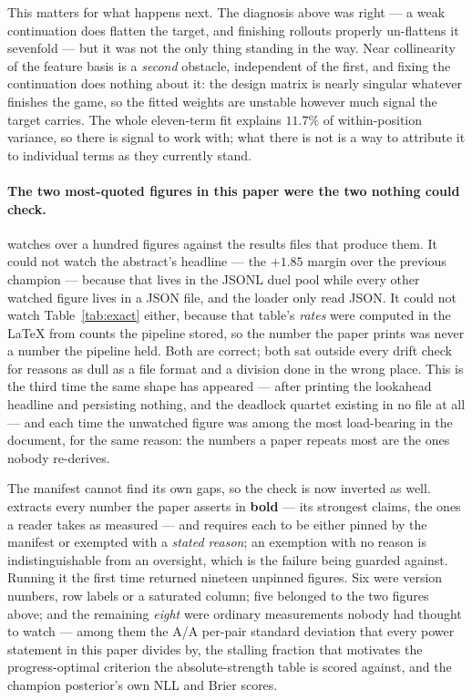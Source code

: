\documentclass[11pt,a4paper]{article}
\begin{document}
This matters for what happens next. The diagnosis above was right --- a weak
continuation does flatten the target, and finishing rollouts properly un-flattens
it sevenfold --- but it was not the only thing standing in the way. Near
collinearity of the feature basis is a \emph{second} obstacle, independent of the
first, and fixing the continuation does nothing about it: the design matrix is
nearly singular whatever finishes the game, so the fitted weights are unstable
however much signal the target carries. The whole eleven-term fit explains
$11.7\%$ of within-position variance, so there is signal to work with; what
there is not is a way to attribute it to individual terms as they currently
stand.

\paragraph{The two most-quoted figures in this paper were the two nothing could
check.}  watches over a hundred figures
against the results files that produce them. It could not watch the abstract's
headline --- the $+1.85$ margin over the previous champion --- because that
lives in the JSONL duel pool while every other watched figure lives in a JSON
file, and the loader only read JSON. It could not watch
Table~\ref{tab:exact} either, because that table's \emph{rates} were computed in
the \LaTeX{} from counts the pipeline stored, so the number the paper prints was
never a number the pipeline held. Both are correct; both sat outside every drift
check for reasons as dull as a file format and a division done in the wrong
place. This is the third time the same shape has appeared --- after
 printing the lookahead headline and persisting
nothing, and the deadlock quartet existing in no file at all --- and each time
the unwatched figure was among the most load-bearing in the document, for the
same reason: the numbers a paper repeats most are the ones nobody re-derives.

The manifest cannot find its own gaps, so the check is now inverted as well.
 extracts every number the paper asserts
in \textbf{bold} --- its strongest claims, the ones a reader takes as measured
--- and requires each to be either pinned by the manifest or exempted with a
\emph{stated reason}; an exemption with no reason is indistinguishable from an
oversight, which is the failure being guarded against. Running it the first
time returned nineteen unpinned figures. Six were version numbers, row labels
or a saturated column; five belonged to the two figures above; and the
remaining \emph{eight} were ordinary measurements nobody had thought to
watch --- among them the A/A per-pair standard deviation that every power
statement in this paper divides by, the stalling fraction that motivates the
progress-optimal criterion the absolute-strength table is scored against, and
the champion posterior's own NLL and Brier scores.
\end{document}
